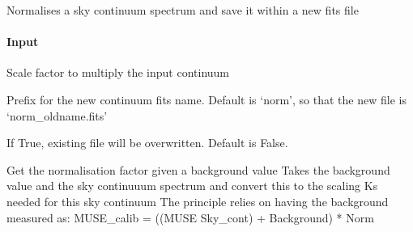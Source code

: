 \documentclass[letterpaper,10pt,english]{sphinxmanual}
\begin{document}
\begin{fulllineitems}
\begin{fulllineitems}
\label{\detokenize{api/pymusepipe:pymusepipe.mpdaf_pipe.MuseSkyContinuum.save_normalised}}
\pysigstartsignatures
{}
\pysigstopsignatures
\sphinxAtStartPar
Normalises a sky continuum spectrum and save it
within a new fits file


\paragraph{Input}
\label{\detokenize{api/pymusepipe:id96}}\begin{description}
\sphinxAtStartPar
Scale factor to multiply the input continuum

\sphinxAtStartPar
Prefix for the new continuum fits name. Default
is ‘norm’, so that the new file is ‘norm\_oldname.fits’

\sphinxAtStartPar
If True, existing file will be overwritten.
Default is False.

\end{description}

\end{fulllineitems}


\begin{fulllineitems}
\label{\detokenize{api/pymusepipe:pymusepipe.mpdaf_pipe.MuseSkyContinuum.set_normfactor}}
\pysigstartsignatures
{}
\pysigstopsignatures
\sphinxAtStartPar
Get the normalisation factor given a background value
Takes the background value and the sky continuuum spectrum
and convert this to the scaling Ks needed for this sky continuum
The principle relies on having the background measured as:
MUSE\_calib = ((MUSE \sphinxhyphen{} Sky\_cont) + Background) * Norm


\end{fulllineitems}
\end{fulllineitems}
\end{document}
